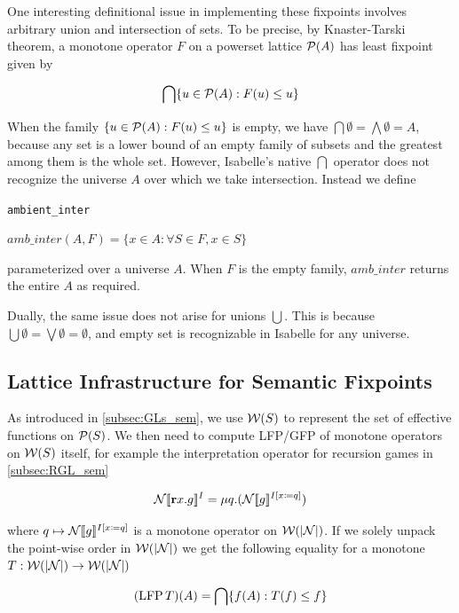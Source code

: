 One interesting definitional issue in implementing these fixpoints involves arbitrary union and intersection of sets. To be precise, by Knaster-Tarski theorem, a monotone operator $F$ on a powerset lattice $\mathcal{P}(A)$ has least fixpoint given by 

\[\bigcap\{u\in \mathcal{P}(A): F(u) \leq u\}\]

When the family $\{u\in \mathcal{P}(A): F(u) \leq u\}$ is empty, we have $\bigcap \emptyset = \bigwedge\emptyset = A$, because any set is a lower bound of an empty family of subsets and the greatest among them is the whole set. However, Isabelle's native $\bigcap$ operator does not recognize the universe $A$ over which we take intersection. Instead we define

\begin{bdefinition}
\texttt{ambient\_inter}

$amb\_inter(A,F) = \{x\in A: \forall S \in F, x\in S\}$
    
\end{bdefinition}

parameterized over a universe $A$. When $F$ is the empty family, $amb\_inter$ returns the entire $A$ as required.

Dually, the same issue does not arise for unions $\bigcup$. This is because $\bigcup \emptyset = \bigvee\emptyset = \emptyset$, and empty set is recognizable in Isabelle for any universe.

\subsection{Lattice Infrastructure for Semantic Fixpoints}
\label{subsec:lattice_locale}
As introduced in \autoref{subsec:GLs_sem}, we use $\mathcal{W}(S)$ to represent the set of effective functions on $\mathcal{P}(S)$. We then need to compute LFP/GFP of monotone operators on $\mathcal W(S)$ itself, for example the interpretation operator for recursion games in \autoref{subsec:RGL_sem}

\[\mathcal N[\![ \textbf{r} x. g]\!]^I=\mu q.(\mathcal N[\![ g]\!]^{I[x\coloneq q]})\]

where $q\mapsto \mathcal N[\![ g]\!]^{I[x\coloneq q]}$ is a monotone operator on $\mathcal W(|\mathcal N|)$. If we solely unpack the point-wise order in $\mathcal W(|\mathcal N|)$ we get the following equality for a monotone $T:\mathcal W(|\mathcal N|) \rightarrow \mathcal W(|\mathcal N|)$

\[ (\operatorname{LFP} T)(A) = \bigcap \{f(A): T(f)\leq f\}\]

